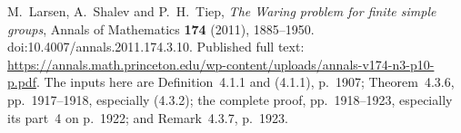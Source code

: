 M.~Larsen, A.~Shalev and P.~H.~Tiep,
\emph{The Waring problem for finite simple groups},
Annals of Mathematics \textbf{174} (2011), 1885--1950.
doi:10.4007/annals.2011.174.3.10.
Published full text:
\url{https://annals.math.princeton.edu/wp-content/uploads/annals-v174-n3-p10-p.pdf}.
The inputs here are Definition~4.1.1 and (4.1.1), p.~1907;
Theorem~4.3.6, pp.~1917--1918, especially (4.3.2);
the complete proof, pp.~1918--1923, especially its part~4 on p.~1922;
and Remark~4.3.7, p.~1923.
